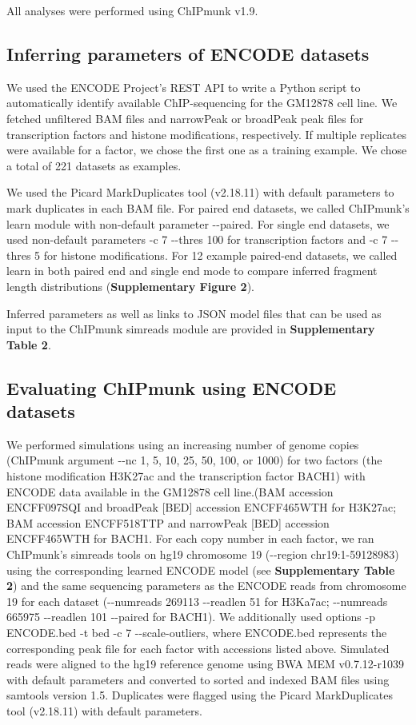 \documentclass[12pt]{article}
\begin{document}
All analyses were performed using ChIPmunk v1.9. %

\subsection*{Inferring parameters of ENCODE datasets}

We used the ENCODE Project's REST API to write a Python script to automatically identify available ChIP-sequencing for the GM12878 cell line.
We fetched unfiltered BAM files and narrowPeak or broadPeak peak files for transcription factors and histone modifications, respectively.
If multiple replicates were available for a factor, we chose the first one as a training example.
We chose a total of 221 datasets as examples.

We used the Picard \cite{picard} MarkDuplicates tool (v2.18.11) with default parameters to mark duplicates in each BAM file.
For paired end datasets, we called ChIPmunk's learn module with non-default parameter -{}-paired.
For single end datasets, we used non-default parameters -c 7 -{}-thres 100 for transcription factors and -c 7 -{}-thres 5 for histone modifications.
For 12 example paired-end datasets, we called learn in both paired end and single end mode to compare inferred fragment length distributions (\textbf{Supplementary Figure 2}).

Inferred parameters as well as links to JSON model files that can be used as input to the ChIPmunk simreads module are provided in \textbf{Supplementary Table 2}.

\subsection*{Evaluating ChIPmunk using ENCODE datasets}

We performed simulations using an increasing number of genome copies (ChIPmunk argument -{}-nc 1, 5, 10, 25, 50, 100, or 1000) for two factors (the histone modification H3K27ac and the transcription factor BACH1) with ENCODE data available in the GM12878 cell line.(BAM accession ENCFF097SQI and broadPeak [BED] accession ENCFF465WTH for H3K27ac; BAM accession ENCFF518TTP and narrowPeak [BED] accession ENCFF465WTH for BACH1.
For each copy number in each factor, we ran ChIPmunk's simreads tools on hg19 chromosome 19 (-{}-region chr19:1-59128983) using the corresponding learned ENCODE model (see \textbf{Supplementary Table 2}) and the same sequencing parameters as the ENCODE reads from chromosome 19 for each dataset (-{}-numreads 269113 -{}-readlen 51 for H3Ka7ac; -{}-numreads 665975 -{}-readlen 101 -{}-paired for BACH1). 
We additionally used options -p ENCODE.bed -t bed -c 7 -{}-scale-outliers, where ENCODE.bed represents the corresponding peak file for each factor with accessions listed above.
Simulated reads were aligned to the hg19 reference genome using BWA MEM \cite{bwamem} v0.7.12-r1039 with default parameters and converted to sorted and indexed BAM files using samtools \cite{samtools} version 1.5. Duplicates were flagged using the Picard \cite{picard} MarkDuplicates tool (v2.18.11) with default parameters.
\end{document}

